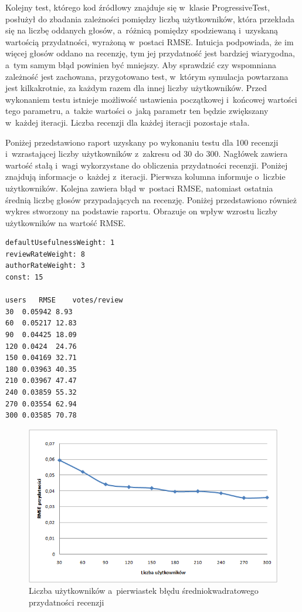 Kolejny test, którego kod źródłowy znajduje się w~klasie ProgressiveTest, posłużył do zbadania zależności pomiędzy liczbą użytkowników, która przekłada się na liczbę oddanych głosów, a~różnicą pomiędzy spodziewaną i~uzyskaną wartością przydatności, wyrażoną w~postaci RMSE. Intuicja podpowiada, że im więcej głosów oddano na recenzję, tym jej przydatność jest bardziej wiarygodna, a~tym samym błąd powinien być mniejszy. Aby sprawdzić czy wspomniana zależność jest zachowana, przygotowano test, w~którym symulacja powtarzana jest kilkakrotnie, za każdym razem dla innej liczby użytkowników. Przed wykonaniem testu istnieje możliwość ustawienia początkowej i~końcowej wartości tego parametru, a~także wartości o~jaką parametr ten będzie zwiększany w~każdej iteracji. Liczba recenzji dla każdej iteracji pozostaje stała.

Poniżej przedstawiono raport uzyskany po wykonaniu testu dla 100 recenzji i~wzrastającej liczby użytkowników z~zakresu od 30 do 300. Nagłówek zawiera wartość stałą i~wagi wykorzystane do obliczenia przydatności recenzji. Poniżej znajdują informacje o~każdej z~iteracji. Pierwsza kolumna informuje o~liczbie użytkowników. Kolejna zawiera błąd w~postaci RMSE, natomiast ostatnia średnią liczbę głosów przypadających na recenzję. Poniżej przedstawiono również wykres stworzony na podstawie raportu. Obrazuje on wpływ wzrostu liczby użytkowników na wartość RMSE.

\begin{lstlisting}
defaultUsefulnessWeight: 1
reviewRateWeight: 8
authorRateWeight: 3
const: 15

users	RMSE	votes/review	
30	0.05942	8.93
60	0.05217	12.83
90	0.04425	18.09
120	0.0424	24.76
150	0.04169	32.71
180	0.03963	40.35
210	0.03967	47.47
240	0.03859	55.32
270	0.03554	62.94
300	0.03585	70.78
\end{lstlisting}

\begin{figure}[h]
	\centering
	\includegraphics[width=\textwidth, keepaspectratio=true]{images/ProgressiveTest.png}
	\caption{Liczba użytkowników a~pierwiastek błędu średniokwadratowego przydatności recenzji}
\end{figure}

